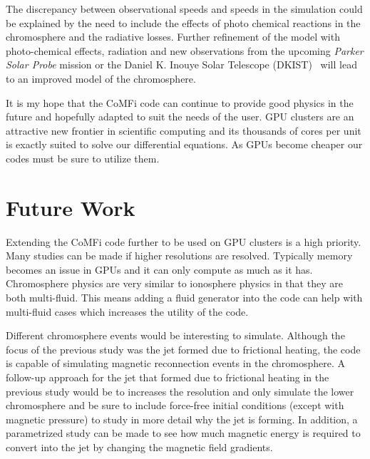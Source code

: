 \documentclass[12pt,upcase]{umlthesis}
\begin{document}
The discrepancy between observational speeds and speeds in the simulation could be explained by the need to include the effects of photo chemical reactions in the chromosphere and the radiative losses. Further refinement of the model with photo-chemical effects, radiation and new observations from the upcoming {\it Parker Solar Probe\/} mission or the Daniel K. Inouye Solar Telescope (DKIST)~\citep{dkist} will lead to an improved model of the chromosphere.  

It is my hope that the CoMFi code can continue to provide good physics in the future and hopefully adapted to suit the needs of the user. GPU clusters are an attractive new frontier in scientific computing and its thousands of cores per unit is exactly suited to solve our differential equations. As GPUs become cheaper our codes must be sure to utilize them.

\section{Future Work}\label{sec:futurework}

Extending the CoMFi code further to be used on GPU clusters is a high priority. Many studies can be made if higher resolutions are resolved. Typically memory becomes an issue in GPUs and it can only compute as much as it has. Chromosphere physics are very similar to ionosphere physics in that they are both multi-fluid. This means adding a fluid generator into the code can help with multi-fluid cases which increases the utility of the code.

Different chromosphere events would be interesting to simulate. Although the focus of the previous study was the jet formed due to frictional heating, the code is capable of simulating magnetic reconnection events in the chromosphere. A follow-up approach for the jet that formed due to frictional heating in the previous study would be to increases the resolution and only simulate the lower chromosphere and be sure to include force-free initial conditions (except with magnetic pressure) to study in more detail why the jet is forming. In addition, a parametrized study can be made to see how much magnetic energy is required to convert into the jet by changing the magnetic field gradients.

\nocite{*}



\end{document}
